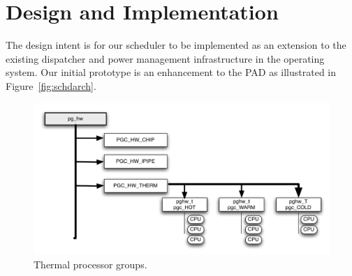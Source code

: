 \documentclass[times,12pt,onecolumn]{article}
\begin{document}
\section{Design and Implementation}
\label{sec:design}
The design intent is for our scheduler to be
implemented as an extension to the existing dispatcher and power
management infrastructure in the operating system.  Our initial
prototype is an enhancement to the PAD as illustrated in
Figure~\ref{fig:schdarch}.
\begin{figure}[htbp]
  \centering
  \includegraphics[scale=0.40]{procgroup.pdf}
  \caption{Thermal processor groups.}
  \label{fig:thpg}
\end{figure}
\end{document}
